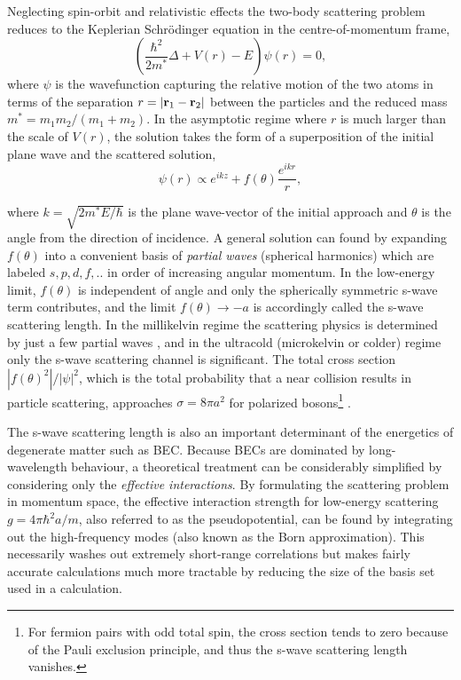 	Neglecting spin-orbit and relativistic effects the two-body scattering problem reduces to the Keplerian Schr\"{o}dinger equation in the centre-of-momentum frame,
	\begin{equation}
	\left(\frac{\hbar^2}{2m^*}\Delta + V(r) - E\right)\psi(r) = 0,
	\end{equation}
	where $\psi$ is the wavefunction capturing the relative motion of the two atoms	in terms of the separation $r=|\textbf{r}_1-\textbf{r}_2|$ between the particles and the reduced mass $m^*=m_1m_2/(m_1+m_2)$.
	In the asymptotic regime where $r$ is much larger than the scale of $V(r)$, the solution takes the form of a superposition of the initial plane wave and the scattered solution,
	\begin{equation}
	\psi(r) \propto e^{ikz} + f(\theta)\frac{e^{ikr}}{r},
	\end{equation}

	where $k=\sqrt{2m^*E/\hbar}$ is the plane wave-vector of the initial approach and $\theta$ is the angle from the direction of incidence.
	A general solution can found by expanding $f(\theta)$ into a convenient basis of \emph{partial waves} (spherical harmonics) which are labeled $s,p,d,f,..$ in order of increasing angular momentum.
	In the low-energy limit, $f(\theta)$ is independent of angle and only the spherically symmetric s-wave term contributes, and the limit $f(\theta)\rightarrow-a$ is accordingly called the s-wave scattering length.
	In the millikelvin regime the scattering physics is determined by just a few partial waves \cite{mcnamara07}, and in the ultracold (microkelvin or colder) regime only the s-wave scattering channel is significant.
	The total cross section $|f(\theta)^2|/|\psi|^2$, which is the total probability that a near collision results in particle scattering, approaches $\sigma=8\pi a^2$ for polarized bosons\footnote{For fermion pairs with odd total spin, the cross section tends to zero because of the Pauli exclusion principle, and thus the s-wave scattering length vanishes.} \cite{przybytek05}.
	

	The s-wave scattering length is also an important determinant of the energetics of degenerate matter such as BEC.
	Because BECs are dominated by long-wavelength behaviour, a theoretical treatment can be considerably simplified by considering only the \emph{effective interactions}.
	By formulating the scattering problem in momentum space, the effective interaction strength for low-energy scattering  $g=4\pi \hbar^2 a/m$, also referred to as the pseudopotential, can be found by integrating out the high-frequency modes (also known as the Born approximation).
	This necessarily washes out extremely short-range correlations but makes fairly accurate calculations much more tractable by reducing the size of the basis set used in a calculation.

